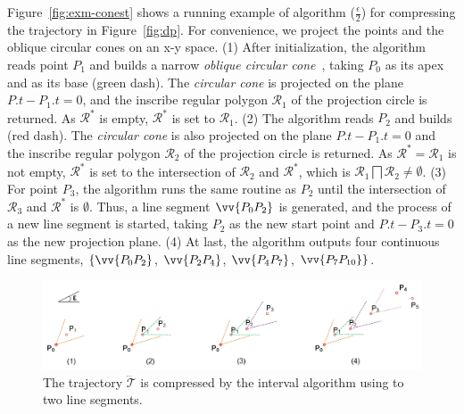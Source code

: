 \begin{example}
	\label{exm-alg-conest}
	Figure~\ref{fig:exm-conest} shows a running example of algorithm \cised($\frac{\epsilon}{2}$) for compressing the trajectory  in Figure~\ref{fig:dp}.
	For convenience, we project the points and the oblique circular cones on an x-y space.
	(1) After initialization, the \cised algorithm reads point $P_1$ and builds a narrow \emph{oblique circular cone}~, taking $P_0$ as its apex and  as its base (green dash). The \emph{circular cone} is projected on the plane $P.t-P_1.t=0$, and the inscribe regular polygon $\mathcal{R}_1$ of the projection circle is returned. As $\mathcal{R}^*$ is empty, $\mathcal{R}^*$ is set to $\mathcal{R}_1$.
	(2) The algorithm reads $P_2$ and builds  (red dash). The \emph{circular cone} is also projected on the plane $P.t-P_1.t=0$ and the inscribe regular polygon $\mathcal{R}_2$ of the projection circle is returned. As $\mathcal{R}^*=\mathcal{R}_1$ is not empty, $\mathcal{R}^*$ is set to the intersection of $\mathcal{R}_2$ and $\mathcal{R}^*$, which is $\mathcal{R}_1 \bigsqcap \mathcal{R}_2 \ne \emptyset$.
	(3) For point $P_3$, the algorithm runs the same routine as $P_2$ until the intersection of $\mathcal{R}_3$ and $\mathcal{R}^*$ is $\emptyset$. Thus, a line segment $\vv{P_0P_2}$ is generated, and the process of a new line segment is started, taking $P_2$ as the new start point and $P.t-P_3.t=0$ as the new projection plane.
	(4) At last, the algorithm outputs four continuous line segments, \ie $\{\vv{P_0P_2}$, $\vv{P_2P_4}$, $\vv{P_4P_{7}}$, $\vv{P_7P_{10}}\}$. %
\end{example} 	


\begin{figure}[tb!]
	\centering
	\includegraphics[scale=0.66]{Figures/Fig-interval.jpg}
	\vspace{-1ex}
	\caption{\small The trajectory $\dddot{\mathcal{T}}$ is compressed by the interval algorithm using \dad to two line segments.}
	\vspace{-1ex}
	\label{fig:interval}
\end{figure}




